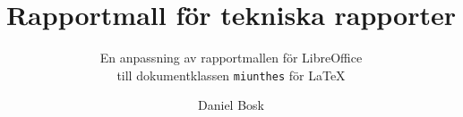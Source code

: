 \documentclass[a4paper,knd,final]{miunthes} %
\title{Rapportmall för tekniska rapporter}
\subtitle{En anpassning av rapportmallen för LibreOffice\\
till dokumentklassen \texttt{miunthes} för \LaTeX}
\author{Daniel Bosk}
\begin{document}
	\begin{titlingpage}
		\maketitle
	\end{titlingpage}
	\frontmatter
	
	\cleardoublepage
	
	\cleardoublepage
	
	\cleardoublepage
	\tableofcontents
	\cleardoublepage
	\listoffigures
	\cleardoublepage
	\listoftables
	\cleardoublepage
	\printnomenclature

	\mainmatter
	
	
	
	
	
	
	

  \printbibliography

	\appendix
	

	\backmatter
\end{document}
